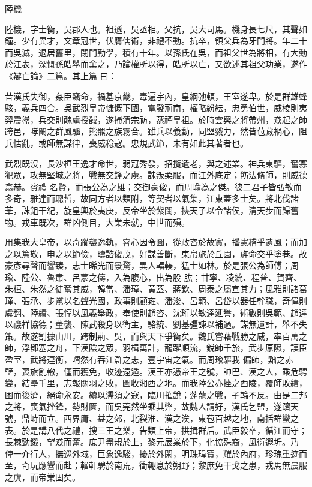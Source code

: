 
\begin{pinyinscope}
陸機



 陸機，字士衡，吳郡人也。祖遜，吳丞相。父抗，吳大司馬。機身長七尺，其聲如鐘。少有異才，文章冠世，伏膺儒術，非禮不動。抗卒，領父兵為牙門將。年二十而吳滅，退居舊里，閉門勤學，積有十年。以孫氏在吳，而祖父世為將相，有大勳於江表，深慨孫皓舉而棄之，乃論權所以得，皓所以亡，又欲述其祖父功業，遂作《辯亡論》二篇。其上篇
 曰：



 昔漢氏失御，姦臣竊命，禍基京畿，毒遍宇內，皇綱弛頓，王室遂卑。於是群雄蜂駭，義兵四合。吳武烈皇帝慷慨下國，電發荊南，權略紛紜，忠勇伯世，威棱則夷羿震盪，兵交則醜虜授馘，遂掃清宗祊，蒸禋皇祖。於時雲興之將帶州，猋起之師跨邑，哮闞之群風驅，熊羆之族霧合。雖兵以義動，同盟戮力，然皆苞藏禍心，阻兵怙亂，或師無謀律，喪威稔寇。忠規武節，未有如此其著者也。



 武烈既沒，長沙桓王逸才命世，弱冠秀發，招攬遺老，與之述業。神兵東驅，奮寡犯眾，攻無堅城之將，戰無交鋒之虜。誅叛柔服，而江外底定；飭法脩師，則威德翕赫。賓禮
 名賢，而張公為之雄；交御豪俊，而周瑜為之傑。彼二君子皆弘敏而多奇，雅達而聰哲，故同方者以類附，等契者以氣集，江東蓋多士矣。將北伐諸華，誅鉏干紀，旋皇輿於夷庚，反帝坐於紫闥，挾天子以令諸侯，清天步而歸舊物。戎車既次，群凶側目，大業未就，中世而殞。



 用集我大皇帝，以奇蹤襲逸軌，睿心因令圖，從政咨於故實，播憲稽乎遺風；而加之以篤敬，申之以節儉，疇諮俊茂，好謀善斷，束帛旅於丘園，旌命交乎塗巷。故豪彥尋聲而響臻，志士晞光而景騖，異人輻輳，猛士如林。於是張公為師傅；周瑜、陸公、魯肅、呂蒙之儔，入為腹心，出為股
 肱；甘寧、凌統、程普、賀齊、朱桓、朱然之徒奮其威，韓當、潘璋、黃蓋、蔣欽、周泰之屬宣其力；風雅則諸葛瑾、張承、步騭以名聲光國，政事則顧雍、潘浚、呂範、呂岱以器任幹職，奇偉則虞翻、陸績、張惇以風義舉政，奉使則趙咨、沈珩以敏達延譽，術數則吳範、趙達以禨祥協德；董襲、陳武殺身以衛主，駱統、劉基彊諫以補過。謀無遺計，舉不失策。故遂割據山川，跨制荊、吳，而與天下爭衡矣。魏氏嘗藉戰勝之威，率百萬之師，浮鄧塞之舟，下漢陰之眾，羽楫萬計，龍躍順流，銳師千旅，武步原隰，謨臣盈室，武將連衡，喟然有吞江滸之志，壹宇宙之氣。而周瑜驅我
 偏師，黜之赤壁，喪旗亂轍，僅而獲免，收迹遠遁。漢王亦憑帝王之號，帥巴、漢之人，乘危騁變，結壘千里，志報關羽之敗，圖收湘西之地。而我陸公亦挫之西陵，覆師敗績，困而後濟，絕命永安。續以濡須之寇，臨川摧銳；蓬蘢之戰，孑輪不反。由是二邦之將，喪氣挫鋒，勢財匱，而吳莞然坐乘其弊，故魏人請好，漢氏乞盟，遂躋天號，鼎峙而立。西界庸、益之郊，北裂淮、漢之涘，東苞百越之地，南括群蠻之表。於是講八代之禮，搜三王之樂，告類上帝，拱揖群后。武臣毅卒，循江而守；長棘勁鎩，望猋而奮。庶尹盡規於上，黎元展業於下，化協殊裔，風衍遐圻。乃
 俾一介行人，撫巡外域，巨象逸駿，擾於外閑，明珠瑋寶，耀於內府，珍瑰重迹而至，奇玩應響而赴；輶軒騁於南荒，衝輣息於朔野；黎庶免干戈之患，戎馬無晨服之虞，而帝業固矣。




\end{pinyinscope}
